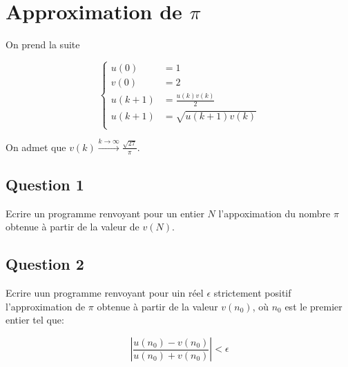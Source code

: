 \section{Approximation de $\pi$}

On prend la suite

$$
\begin{cases}
u(0) &= 1 \\
v(0) &= 2 \\
u(k+1) &= \frac{u(k)v(k)}{2} \\
u(k+1) &= \sqrt{u(k+1) v(k)} \\
\end{cases}
$$

On admet que $v(k) \xrightarrow{k \to \infty} \frac{\sqrt{27}}{\pi}$.

\subsection*{Question 1}
 Ecrire un programme renvoyant pour un entier $N$ l'appoximation du nombre $\pi$ obtenue à partir de la valeur de $v(N)$.
 
\subsection*{Question 2}

Ecrire uun programme renvoyant pour uin réel $\epsilon$ strictement positif l'approximation de $\pi$ obtenue à partir de la valeur $v(n_0)$, où $n_0$ est le premier entier tel que:

$$
|\frac{u(n_0) - v(n_0)}{u(n_0) + v(n_0)}|< \epsilon
$$
